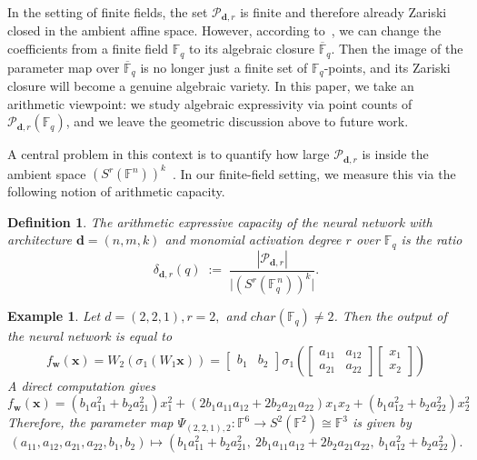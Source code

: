 \documentclass[a4paper]{cas-sc}
\newcommand{\xx}{\textbf{x}}    %
\newcommand{\ww}{\mathbf{w}}    %
\newcommand{\dd}{\mathbf{d}}    %
\newcommand{\F}{\mathbb{F}}
\newtheorem{definition}{Definition}[section]
\newtheorem{example}[theorem]{Example}
\begin{document}
    In the setting of finite fields, the set $\mathcal{P}_{\dd,r}$ is finite and therefore already Zariski closed in the ambient affine space. However, according to~\cite{GORTZ10}, we can change the coefficients from a finite field $\F_q$ to its algebraic closure $\overline{\F}_q$. Then the image of the parameter map over $\overline{\F}_q$ is no longer just a finite set of $\F_q$-points, and its Zariski closure will become a genuine algebraic variety. In this paper, we take an arithmetic viewpoint: we study algebraic expressivity via point counts of $\mathcal{P}_{\dd,r}(\F_q)$, and we leave the geometric discussion above to future work.

    A central problem in this context is to quantify how large $\mathcal{P}_{\dd,r}$ is inside the ambient space $(S^r(\F^n))^k$~\citep{KILEEL19}. In our finite-field setting, we measure this via the following notion of arithmetic capacity.
    
    \begin{definition}\label{def: expressive_capacity}
        The \textit{arithmetic expressive capacity} of the neural network with architecture $\dd=(n,m,k)$
        and monomial activation degree $r$ over $\F_q$ is the ratio
        \[
            \delta_{\dd,r}(q)
            \;:=\;
            \frac{|\mathcal{P}_{\dd,r}|}{\bigl|\left(S^r(\F^{\,n}_q)\right)^k\bigr|}.
        \]
    \end{definition}

    
    \begin{example}
        Let $d = (2,2,1), r = 2,$ and $char(\F_q)\neq2$. Then the output of the neural network is equal to
        \[
            f_{\ww}(\xx) = W_2(\sigma_1(W_1\xx)) = \begin{bmatrix}
                b_1 & b_2
            \end{bmatrix}\sigma_1\left(\begin{bmatrix}
                a_{11} & a_{12}\\
                a_{21} & a_{22}
            \end{bmatrix}\begin{bmatrix}
                x_1\\
                x_2
            \end{bmatrix}\right)
        \]
        A direct computation gives
        \[
            f_{\ww}(\xx) = (b_1 a_{11}^2 + b_2 a_{21}^2)x_1^2 + (2b_1 a_{11} a_{12} + 2b_2 a_{21} a_{22})x_1 x_2 + (b_1 a_{12}^2 + b_2 a_{22}^2)x_2^2
        \]
        Therefore, the parameter map $\Psi_{(2,2,1),2} : \F^6 \rightarrow S^2(\F^2)\cong\F^3$ is given by
        \[
            (a_{11}, a_{12}, a_{21}, a_{22}, b_1, b_2) \mapsto 
            \left(
                b_1 a_{11}^2 + b_2 a_{21}^2,\ 
                2b_1 a_{11} a_{12} + 2b_2 a_{21} a_{22},\ 
                b_1 a_{12}^2 + b_2 a_{22}^2
            \right).
        \]
    \end{example}
\end{document}
